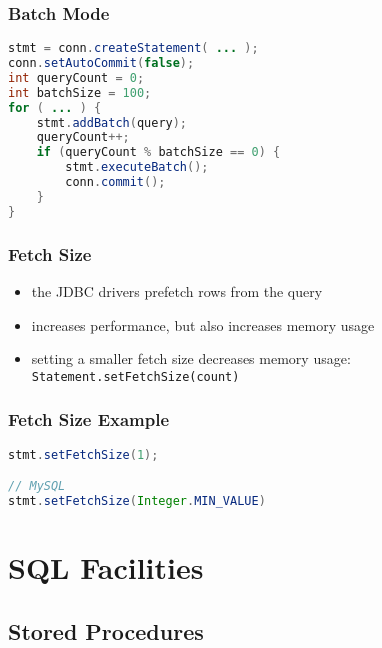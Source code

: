 \documentclass[dvipsnames]{beamer}
\theoremstyle{plain}
\begin{document}
\begin{frame}[fragile]
  \frametitle{Batch Mode}

  \begin{block}{}
    \begin{lstlisting}[language=Java]
stmt = conn.createStatement( ... );
conn.setAutoCommit(false);
int queryCount = 0;
int batchSize = 100;
for ( ... ) {
    stmt.addBatch(query);
    queryCount++;
    if (queryCount % batchSize == 0) {
        stmt.executeBatch();
        conn.commit();
    }
}
    \end{lstlisting}
  \end{block}
\end{frame}

\begin{frame}
  \frametitle{Fetch Size}

  \begin{itemize}
    \item the JDBC drivers prefetch rows from the query
    \item increases performance, but also increases memory usage

    \pause
    \medskip
    \item setting a smaller fetch size decreases memory usage:\\
      \lstinline!Statement.setFetchSize(count)!
  \end{itemize}
\end{frame}

\begin{frame}[fragile]
  \frametitle{Fetch Size Example}

  \begin{block}{}
    \begin{lstlisting}[language=Java]
stmt.setFetchSize(1);

// MySQL
stmt.setFetchSize(Integer.MIN_VALUE)
    \end{lstlisting}
  \end{block}
\end{frame}

\section{SQL Facilities}

\subsection{Stored Procedures}
\end{document}
